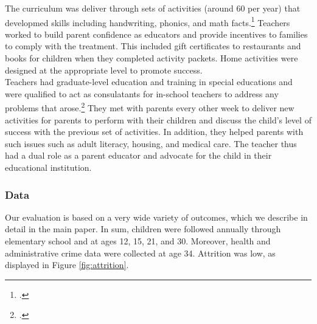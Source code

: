 \noindent The curriculum was deliver through sets of activities (around 60 per year) that developmed skills including handwriting, phonics, and math facts.\footnote{\cite{Campbell-Ramey_1989_Preschool-vs-School-age}.} Teachers worked to build parent confidence as educators and provide incentives to families to comply with the treatment. This included gift certificates to restaurants and books for children when they completed activity packets. Home activities were designed at the appropriate level to promote success.\\

\noindent Teachers had graduate-level education and training in special educations and were qualified to act as consulatants for in-school teachers to address any problems that arose.\footnote{\cite{Ramey_Campbell_1991_childreninpoverty}.} They met with parents every other week to deliver new activities for parents to perform with their children and discuss the child's level of success with the previous set of activities. In addition, they helped parents with such issues such as adult literacy, housing, and medical care. The teacher thus had a dual role as a parent educator and advocate for the child in their educational institution.

\subsubsection{Data} \label{appendix:data}

Our evaluation is based on a very wide variety of outcomes, which we describe in detail in the main paper. In sum, children were followed annually through elementary school and at ages 12, 15, 21, and 30. Moreover, health and administrative crime data were collected at age 34.  Attrition was low, as displayed in Figure \ref{fig:attrition}.\\


